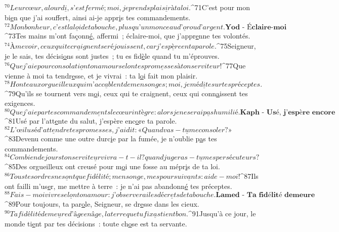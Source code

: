 ${}^{70}Leur cœur, alourd\underline{i}, s’est fermé ;
        moi, je prends plais\underline{i}r à ta loi.
${}^{71}C’est pour mon bi\underline{e}n que j’ai souffert,
        ainsi ai-je appr\underline{i}s tes commandements.
${}^{72}Mon bonheur, c’est la l\underline{o}i de ta bouche,
        plus qu’un monceau d’\underline{o}r ou d’argent.
\textbf{Yod - Éclaire-moi}
${}^{73}Tes mains m’ont façonn\underline{é}, affermi ;
        éclaire-moi, que j’appr\underline{e}nne tes volontés.
${}^{74}À me voir, ceux qui te cr\underline{a}ignent se réjouissent,
        car j’esp\underline{è}re en ta parole.
${}^{75}Seigneur, je le sais, tes décisi\underline{o}ns sont justes ;
        tu es fid\underline{è}le quand tu m’éprouves.
${}^{76}Que j’aie pour consolati\underline{o}n ton amour
        selon tes prom\underline{e}sses à ton serviteur !
${}^{77}Que vienne à moi ta tendr\underline{e}sse, et je vivrai :
        ta l\underline{o}i fait mon plaisir.
${}^{78}Honte aux orgueilleux qui m’acc\underline{a}blent de mensonges ;
        moi, je méd\underline{i}te sur tes préceptes.
${}^{79}Qu’ils se tournent vers m\underline{o}i, ceux qui te craignent,
        ceux qui conn\underline{a}issent tes exigences.
${}^{80}Que j’aie par tes commandem\underline{e}nts le cœur intègre :
        alors je ne serai p\underline{a}s humilié.
\textbf{Kaph - Usé, j’espère encore}
${}^{81}Usé par l’att\underline{e}nte du salut,
        j’espère enc\underline{o}re ta parole.
${}^{82}L’œil usé d’att\underline{e}ndre tes promesses,
        j’ai dit : « Quand vas-t\underline{u} me consoler ? »
${}^{83}Devenu comme une outre durc\underline{i}e par la fumée,
        je n’oublie p\underline{a}s tes commandements.
${}^{84}Combien de jours ton servite\underline{u}r vivra-t-il ?
        quand jugeras-t\underline{u} mes persécuteurs ?
${}^{85}Des orgueilleux ont creusé pour m\underline{o}i une fosse
        au mépr\underline{i}s de ta loi.
${}^{86}Tous tes ordres ne s\underline{o}nt que fidélité ;
        mensonge, mes poursuiv\underline{a}nts : aide-moi !
${}^{87}Ils ont failli m’us\underline{e}r, me mettre à terre :
        je n’ai pas abandonn\underline{é} tes préceptes.
${}^{88}Fais-moi vivre sel\underline{o}n ton amour :
        j’observerai les décr\underline{e}ts de ta bouche.
\textbf{Lamed - Ta fidélité demeure}
${}^{89}Pour toujours, ta par\underline{o}le, Seigneur,
        se dr\underline{e}sse dans les cieux.
${}^{90}Ta fidélité deme\underline{u}re d’âge en âge,
        la terre que tu fix\underline{a}s tient bon.
${}^{91}Jusqu’à ce jour, le monde ti\underline{e}nt par tes décisions :
        toute ch\underline{o}se est ta servante.
